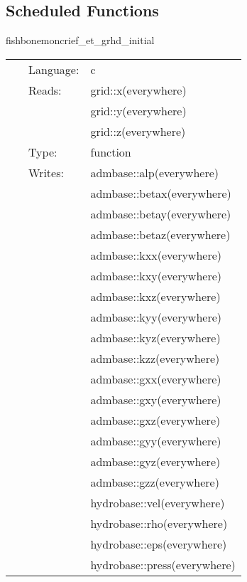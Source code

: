 \documentclass{article}
\begin{document}
\subsection*{Scheduled Functions}
\vspace{5mm}


\hspace{5mm} fishbonemoncrief\_et\_grhd\_initial 

\hspace{5mm}{\it set up general relativistic hydrodynamic (grhd) fields for fishbone-moncrief disk } 


\hspace{5mm}

 \begin{tabular*}{160mm}{cll} 
~ & Language:  & c \\ 
~ & Reads:  & grid::x(everywhere) \\ 
~& ~ &grid::y(everywhere)\\ 
~& ~ &grid::z(everywhere)\\ 
~ & Type:  & function \\ 
~ & Writes:  & admbase::alp(everywhere) \\ 
~& ~ &admbase::betax(everywhere)\\ 
~& ~ &admbase::betay(everywhere)\\ 
~& ~ &admbase::betaz(everywhere)\\ 
~& ~ &admbase::kxx(everywhere)\\ 
~& ~ &admbase::kxy(everywhere)\\ 
~& ~ &admbase::kxz(everywhere)\\ 
~& ~ &admbase::kyy(everywhere)\\ 
~& ~ &admbase::kyz(everywhere)\\ 
~& ~ &admbase::kzz(everywhere)\\ 
~& ~ &admbase::gxx(everywhere)\\ 
~& ~ &admbase::gxy(everywhere)\\ 
~& ~ &admbase::gxz(everywhere)\\ 
~& ~ &admbase::gyy(everywhere)\\ 
~& ~ &admbase::gyz(everywhere)\\ 
~& ~ &admbase::gzz(everywhere)\\ 
~& ~ &hydrobase::vel(everywhere)\\ 
~& ~ &hydrobase::rho(everywhere)\\ 
~& ~ &hydrobase::eps(everywhere)\\ 
~& ~ &hydrobase::press(everywhere)\\ 
\end{tabular*} 
\end{document}
